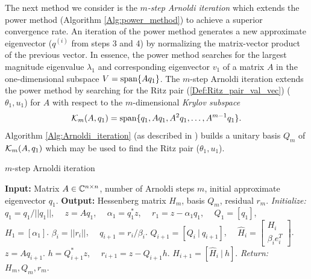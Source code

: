 The next method we consider is the \textit{$m$-step Arnoldi iteration} which extends the power method (Algorithm \ref{Alg:power_method}) to achieve a superior convergence rate.  An iteration of the power method generates a new approximate eigenvector ($q^{(i)}$ from steps 3 and 4) by normalizing the matrix-vector product of the previous vector.  In essence, the power method searches for the largest magnitude eigenvalue $\lambda_1$ and corresponding eigenvector $v_1$ of a matrix $A$ in the one-dimensional subspace $V = \textnormal{span} \{ Aq_1 \}$.  The $m$-step Arnoldi iteration extends the power method by searching for the Ritz pair (\ref{Def:Ritz_pair_val_vec}) ($\theta_1, u_1$) for $A$ with respect to the $m$-dimensional \textit{Krylov subspace}
\begin{equation}
{\mathcal K}_m(A, q_1) = \textnormal{span}\{ q_1, Aq_1, A^2q_1, \ldots, A^{m-1}q_1 \}.
\label{Def:krylov_subspace}
\end{equation}
Algorithm \ref{Alg:Arnoldi_iteration} (as described in \cite[Algorithm 10.5.1]{golub2012matrix}) builds a unitary basis $Q_m$ of ${\mathcal K}_m(A, q_1)$ which may be used to find the Ritz pair ($\theta_1, u_1$).
\begin{algorithm}[H]
\caption{$m$-step Arnoldi iteration}	\label{Alg:Arnoldi_iteration}

\begin{algorithmic}[1]
	\Statex		\textbf{Input:} Matrix $A \in {\mathbb C}^{n \times n}$, number of Arnoldi steps $m$, initial approximate eigenvector $q_1$.
	\Statex 	\textbf{Output:} Hessenberg matrix $H_m$, basis $Q_m$, residual $r_m$.
	\State		\textit{Initialize:} $q_1  = q_1 / ||q_1||$, \ \ $z = Aq_1$, \ \ $\alpha_1 = q_1^*z$, \ \ $r_1 = z - \alpha_1 q_1$, \ \ $Q_1 = [q_1]$, \ \ $H_1 = [\alpha_1]$.
		\State	$\beta_i = ||r_i||$, \ \ $q_{i+1} = r_i / \beta_i$.
		\State	$Q_{i+1} = [Q_i \ | \ q_{i+1}]$, \ \ $\hat{H}_i = \begin{bmatrix}	H_i \\  \beta_i e_i^T	\end{bmatrix}$.
		\State	$z = Aq_{i+1}$.
		\State	$h = Q_{i+1}^*z$, \ \  $r_{i+1} = z - Q_{i+1}h$.
		\State	$H_{i+1} = [\hat{H}_i \ | \ h]$.
	\EndFor
	\State		\textit{Return:} $H_m, Q_m, r_m$.
\end{algorithmic}

\end{algorithm}

